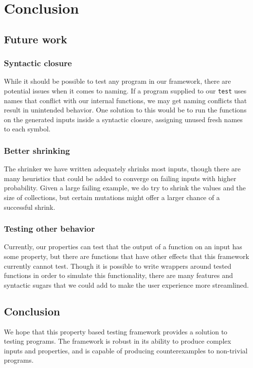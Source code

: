 \section{Conclusion}

\subsection{Future work}

\subsubsection{Syntactic closure}

While it should be possible to test any program in our framework, there are potential issues when it comes to naming. If a program supplied to our \verb|test| uses names that conflict with our internal functions, we may get naming conflicts that result in unintended behavior. One solution to this would be to run the functions on the generated inputs inside a syntactic closure, assigning unused fresh names to each symbol. 

\subsubsection{Better shrinking}

The shrinker we have written adequately shrinks most inputs, though there are many heuristics that could be added to converge on failing inputs with higher probability. Given a large failing example, we do try to shrink the values and the size of collections, but certain mutations might offer a larger chance of a successful shrink.

\subsubsection{Testing other behavior}

Currently, our properties can test that the output of a function on an input has some property, but there are functions that have other effects that this framework currently cannot test. Though it is possible to write wrappers around tested functions in order to simulate this functionality, there are many features and syntactic sugars that we could add to make the user experience more streamlined.

\subsection{Conclusion}

We hope that this property based testing framework provides a solution to testing programs. The framework is robust in its ability to produce complex inputs and properties, and is capable of producing counterexamples to non-trivial programs.